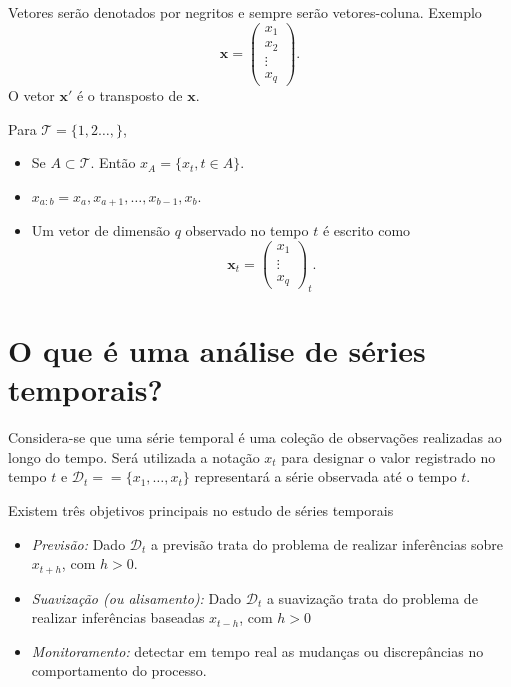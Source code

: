 \documentclass[
  letterpaper,
  DIV=11,
  numbers=noendperiod]{scrreprt}
\providecommand{\tightlist}{%
  \setlength{\itemsep}{0pt}\setlength{\parskip}{0pt}}\usepackage{longtable,booktabs,array}
\theoremstyle{definition}
\theoremstyle{plain}
\theoremstyle{definition}
\theoremstyle{remark}
\begin{document}
Vetores serão denotados por negritos e sempre serão vetores-coluna.
Exemplo
\[\boldsymbol{x}=\left(\begin{array}{c}x_1 \\ x_2 \\ \vdots \\ x_q\end{array}\right).\]
O vetor \(\boldsymbol{x}'\) é o transposto de \(\boldsymbol{x}\).

Para \(\mathcal{T}=\{1,2\ldots,\}\),

\begin{itemize}
\tightlist
\item
  Se \(A\subset\mathcal{T}\). Então \(x_A=\{x_{t},t\in A\}\).
\item
  \(x_{a:b}=x_a,x_{a+1},\ldots,x_{b-1},x_{b}.\)
\item
  Um vetor de dimensão \(q\) observado no tempo \(t\) é escrito como
  \[\boldsymbol{x}_t =\left(\begin{array}{c}x_{1} \\ \vdots \\ x_{q}\end{array}\right)_{t}.\]
\end{itemize}

\hypertarget{o-que-uxe9-uma-anuxe1lise-de-suxe9ries-temporais}{%
\section{O que é uma análise de séries
temporais?}\label{o-que-uxe9-uma-anuxe1lise-de-suxe9ries-temporais}}

Considera-se que uma série temporal é uma coleção de observações
realizadas ao longo do tempo. Será utilizada a notação \(x_t\) para
designar o valor registrado no tempo \(t\) e
\(\mathcal{D}_t==\{x_1,\ldots,x_t\}\) representará a série observada até
o tempo \(t\).

Existem três objetivos principais no estudo de séries temporais

\begin{itemize}
\item
  \emph{Previsão:} Dado \(\mathcal{D}_t\) a previsão trata do problema
  de realizar inferências sobre \(x_{t+h}\), com \(h>0\).
\item
  \emph{Suavização (ou alisamento):} Dado \(\mathcal{D}_t\) a suavização
  trata do problema de realizar inferências baseadas \(x_{t-h}\), com
  \(h>0\)
\item
  \emph{Monitoramento:} detectar em tempo real as mudanças ou
  discrepâncias no comportamento do processo.
\end{itemize}
\end{document}

